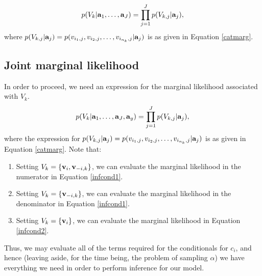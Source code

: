 \documentclass[fleqn,11pt]{wlscirep}
\begin{document}
\begin{equation}
p(V_{k}| {\bf a}_1, \ldots, {\bf a}_J) = \prod_{j = 1}^J p(V_{k,j}|{\bf a}_j),\label{marglikelix}
\end{equation}
where $p(V_{k,j}|{\bf a}_j) = p({ v}_{i_1,j}, { v}_{i_2,j}, \ldots, { v}_{i_{n_k},j}| {\bf a}_j)$ is as given in Equation \eqref{catmarg}.


\subsection{Joint marginal likelihood}
In order to proceed, we need an expression for the marginal likelihood associated with $V_k$.
\begin{equation}
p(V_{k}| {\bf a}_1, \ldots, {\bf a}_J, {\bf a}_y) = \prod_{j = 1}^J p(V_{k,j}|{\bf a}_j),
\end{equation}
where the expression for $p(V_{k,j}|{\bf a}_j) = p({ v}_{i_1,j}, { v}_{i_2,j}, \ldots, { v}_{i_{n_k},j}| {\bf a}_j)$ is as given in Equation \eqref{catmarg}.  Note that:
\begin{enumerate}
  \item Setting $V_k = \{{\bf v}_i, {\bf v}_{-i,k}\}$, we can evaluate the marginal likelihood in the numerator in Equation \eqref{infcond1}.
  \item Setting $V_k = \{{\bf v}_{-i,k}\}$, we can evaluate the marginal likelihood in the denominator in Equation \eqref{infcond1}.
  \item Setting $V_k = \{{\bf v}_i\}$, we can evaluate the marginal likelihood in Equation \eqref{infcond2}.  
  \end{enumerate}

Thus, we may evaluate all of the terms required for the conditionals for $c_i$, and hence (leaving aside, for the time being, the problem of sampling $\alpha$) we have everything we need in order to perform inference for our model.  
\end{document}
